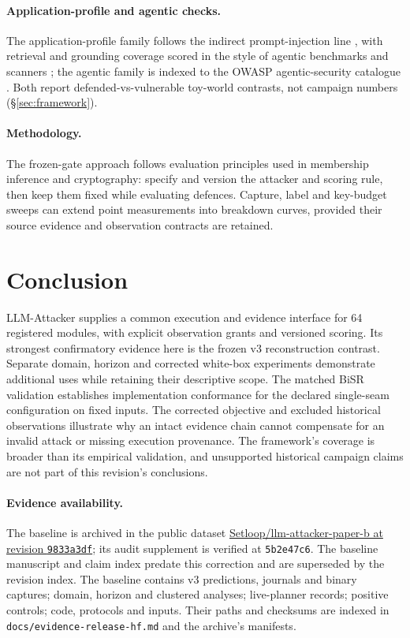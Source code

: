 \documentclass[11pt]{article}
\begin{document}
\paragraph{Application-profile and agentic checks.}
The application-profile family follows the indirect prompt-injection line
\cite{greshake2023not}, with retrieval and grounding coverage scored in
the style of agentic benchmarks and scanners \cite{trivedi2024appworld,garak2024};
the agentic family is indexed to the OWASP agentic-security catalogue
\cite{owasp2026asi}. Both report defended-vs-vulnerable toy-world
contrasts, not campaign numbers (\S\ref{sec:framework}).

\paragraph{Methodology.}
The frozen-gate approach follows evaluation principles used in membership
inference and cryptography: specify and version the attacker and scoring
rule, then keep them fixed while evaluating defences. Capture, label and key-budget sweeps can extend point measurements into breakdown curves, provided their source evidence and observation contracts are retained.

\section{Conclusion}
\label{sec:conclusion}

LLM-Attacker supplies a common execution and evidence interface for 64 registered modules, with explicit observation grants and versioned scoring. Its strongest confirmatory evidence here is the frozen v3 reconstruction contrast. Separate domain, horizon and corrected white-box experiments demonstrate additional uses while retaining their descriptive scope. The matched BiSR validation establishes implementation conformance for the declared single-seam configuration on fixed inputs. The corrected objective and excluded historical observations illustrate why an intact evidence chain cannot compensate for an invalid attack or missing execution provenance. The framework's coverage is broader than its empirical validation, and unsupported historical campaign claims are not part of this revision's conclusions.

\paragraph{Evidence availability.}
The baseline is archived in the public dataset \href{https://huggingface.co/datasets/Setloop/llm-attacker-paper-b/tree/9833a3df9c660a6b214336d029095c46224c6987}{Setloop/llm-attacker-paper-b at revision \texttt{9833a3df}}; its audit supplement is verified at \texttt{5b2e47c6}. The baseline manuscript and claim index predate this correction and are superseded by the revision index. The baseline contains v3 predictions, journals and binary captures; domain, horizon and clustered analyses; live-planner records; positive controls; code, protocols and inputs. Their paths and checksums are indexed in \nolinkurl{docs/evidence-release-hf.md} and the archive's manifests.
\end{document}
